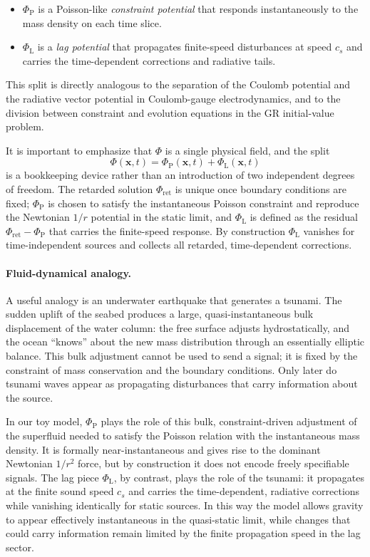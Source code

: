 \documentclass[11pt]{article}
\newcommand{\cS}{c_s}
\newcommand{\PhiP}{\Phi_{\mathrm{P}}}
\newcommand{\PhiL}{\Phi_{\mathrm{L}}}
\begin{document}
\begin{itemize}
  \item $\PhiP$ is a Poisson-like \emph{constraint potential} that responds instantaneously to the mass density on each time slice.
  \item $\PhiL$ is a \emph{lag potential} that propagates finite-speed disturbances at speed $\cS$ and carries the time-dependent corrections and radiative tails.
\end{itemize}

This split is directly analogous to the separation of the Coulomb potential and the radiative vector potential in Coulomb-gauge electrodynamics, and to the division between constraint and evolution equations in the GR initial-value problem.

It is important to emphasize that $\Phi$ is a single physical field, and the split
\begin{equation}
  \Phi(\mathbf{x},t) = \PhiP(\mathbf{x},t) + \PhiL(\mathbf{x},t)
\end{equation}
is a bookkeeping device rather than an introduction of two independent degrees of freedom. The retarded solution $\Phi_{\mathrm{ret}}$ is unique once boundary conditions are fixed; $\PhiP$ is chosen to satisfy the instantaneous Poisson constraint and reproduce the Newtonian $1/r$ potential in the static limit, and $\PhiL$ is defined as the residual $\Phi_{\mathrm{ret}} - \PhiP$ that carries the finite-speed response. By construction $\PhiL$ vanishes for time-independent sources and collects all retarded, time-dependent corrections.

\paragraph{Fluid-dynamical analogy.}

A useful analogy is an underwater earthquake that generates a tsunami. The sudden uplift of the seabed produces a large, quasi-instantaneous bulk displacement of the water column: the free surface adjusts hydrostatically, and the ocean ``knows'' about the new mass distribution through an essentially elliptic balance. This bulk adjustment cannot be used to send a signal; it is fixed by the constraint of mass conservation and the boundary conditions. Only later do tsunami waves appear as propagating disturbances that carry information about the source.

In our toy model, $\PhiP$ plays the role of this bulk, constraint-driven adjustment of the superfluid needed to satisfy the Poisson relation with the instantaneous mass density. It is formally near-instantaneous and gives rise to the dominant Newtonian $1/r^2$ force, but by construction it does not encode freely specifiable signals. The lag piece $\PhiL$, by contrast, plays the role of the tsunami: it propagates at the finite sound speed $\cS$ and carries the time-dependent, radiative corrections while vanishing identically for static sources. In this way the model allows gravity to appear effectively instantaneous in the quasi-static limit, while changes that could carry information remain limited by the finite propagation speed in the lag sector.
\end{document}
